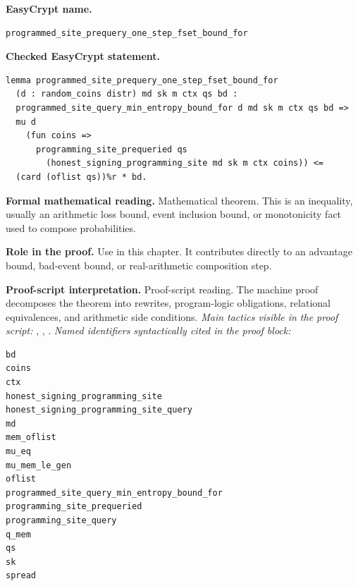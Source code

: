 \begin{formaltheorem}
\noindent\textbf{EasyCrypt name.}
\begin{lstlisting}[language=EasyCrypt,basicstyle=\ttfamily\scriptsize]
programmed_site_prequery_one_step_fset_bound_for
\end{lstlisting}
\noindent\textbf{Checked EasyCrypt statement.}
\begin{lstlisting}[language=EasyCrypt,basicstyle=\ttfamily\scriptsize]
lemma programmed_site_prequery_one_step_fset_bound_for
  (d : random_coins distr) md sk m ctx qs bd :
  programmed_site_query_min_entropy_bound_for d md sk m ctx qs bd =>
  mu d
    (fun coins =>
      programming_site_prequeried qs
        (honest_signing_programming_site md sk m ctx coins)) <=
  (card (oflist qs))%r * bd.
\end{lstlisting}
\noindent\textbf{Formal mathematical reading.}
Mathematical theorem. This is an inequality, usually an arithmetic loss bound, event inclusion bound, or monotonicity fact used to compose probabilities.

\noindent\textbf{Role in the proof.}
Use in this chapter. It contributes directly to an advantage bound, bad-event bound, or real-arithmetic composition step.

\noindent\textbf{Proof-script interpretation.}
Proof-script reading. The machine proof decomposes the theorem into rewrites, program-logic obligations, relational equivalences, and arithmetic side conditions.
\emph{Main tactics visible in the proof script:} , , .
\emph{Named identifiers syntactically cited in the proof block:}
\begin{lstlisting}[language=EasyCrypt,basicstyle=\ttfamily\scriptsize]
bd
coins
ctx
honest_signing_programming_site
honest_signing_programming_site_query
md
mem_oflist
mu_eq
mu_mem_le_gen
oflist
programmed_site_query_min_entropy_bound_for
programming_site_prequeried
programming_site_query
q_mem
qs
sk
spread
\end{lstlisting}

\end{formaltheorem}

